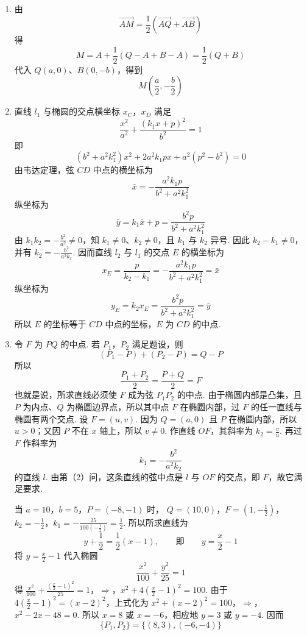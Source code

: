 \begin{solution}
\begin{enumerate}
\item 由
\[
\overrightarrow{AM}
=\frac12\left(\overrightarrow{AQ}+\overrightarrow{AB}\right)
\]
得
\[
M=A+\frac12(Q-A+B-A)=\frac12(Q+B)
\]
代入 \(Q(a,0)\)、\(B(0,-b)\)，得到
\[
M\left(\frac a2,-\frac b2\right)
\]
\item 直线 \(l_1\) 与椭圆的交点横坐标 \(x_C\)，\(x_D\) 满足
\[
\frac{x^2}{a^2}+\frac{(k_1x+p)^2}{b^2}=1
\]
即
\[
(b^2+a^2k_1^2)x^2+2a^2k_1px+a^2(p^2-b^2)=0
\]
由韦达定理，弦 \(CD\) 中点的横坐标为
\[
\bar x=-\frac{a^2k_1p}{b^2+a^2k_1^2}
\]
纵坐标为
\[
\bar y=k_1\bar x+p=\frac{b^2p}{b^2+a^2k_1^2}
\]
由 \(k_1k_2=-\frac{b^2}{a^2}\ne0\)，知 \(k_1\ne0\)、\(k_2\ne0\)，且 \(k_1\) 与 \(k_2\) 异号. 因此 \(k_2-k_1\ne0\)，并有 \(k_2=-\frac{b^2}{a^2k_1}\). 因而直线 \(l_2\) 与 \(l_1\) 的交点 \(E\) 的横坐标为
\[
x_E=\frac{p}{k_2-k_1}
=-\frac{a^2k_1p}{b^2+a^2k_1^2}=\bar x
\]
纵坐标为
\[
y_E=k_2x_E=\frac{b^2p}{b^2+a^2k_1^2}=\bar y
\]
所以 \(E\) 的坐标等于 \(CD\) 中点的坐标，\(E\) 为 \(CD\) 的中点.
\item 令 \(F\) 为 \(PQ\) 的中点. 若 \(P_1\)，\(P_2\) 满足题设，则
\[
(P_1-P)+(P_2-P)=Q-P
\]
所以
\[
\frac{P_1+P_2}{2}=\frac{P+Q}{2}=F
\]
也就是说，所求直线必须使 \(F\) 成为弦 \(P_1P_2\) 的中点. 由于椭圆内部是凸集，且 \(P\) 为内点、\(Q\) 为椭圆边界点，所以其中点 \(F\) 在椭圆内部，过 \(F\) 的任一直线与椭圆有两个交点. 设 \(F=(u,v)\). 因为 \(Q=(a,0)\) 且 \(P\) 在椭圆内部，所以 \(u>0\)；又因 \(P\) 不在 \(x\) 轴上，所以 \(v\ne0\). 作直线 \(OF\)，其斜率为 \(k_2=\frac vu\). 再过 \(F\) 作斜率为
\[
k_1=-\frac{b^2}{a^2k_2}
\]
的直线 \(l\). 由第（2）问，这条直线的弦中点是 \(l\) 与 \(OF\) 的交点，即 \(F\)，故它满足要求.

当 \(a=10\)，\(b=5\)，\(P=(-8,-1)\) 时，
\(Q=(10,0)\)，\(F=\left(1,-\frac12\right)\)，\(k_2=-\frac12\)，\(k_1=-\frac{25}{100(-\frac{1}{2})}=\frac12\).
所以所求直线为
\[
y+\frac12=\frac12(x-1),\qquad\text{即}\qquad y=\frac{x}{2}-1
\]
将 \(y=\frac{x}{2}-1\) 代入椭圆
\[
\frac{x^2}{100}+\frac{y^2}{25}=1
\]
得
\(\frac{x^2}{100}+\frac{(\frac{x}{2}-1)^2}{25}=1\)，\(\Longrightarrow\)，\(x^2+4\left(\frac{x}{2}-1\right)^2=100\).
由于 \(4\left(\frac{x}{2}-1\right)^2=(x-2)^2\)，上式化为
\(x^2+(x-2)^2=100\)，\(\Longrightarrow\)，\(x^2-2x-48=0\).
所以 \(x=8\) 或 \(x=-6\)，相应地 \(y=3\) 或 \(y=-4\). 因而
\[
\{P_1,P_2\}=\{(8,3),(-6,-4)\}
\]
\end{enumerate}
\end{solution}
